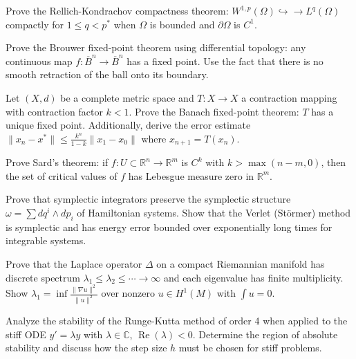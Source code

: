 \documentclass[12pt,a4paper]{exam}
\begin{document}
\begin{questions}
\question[4]
Prove the Rellich-Kondrachov compactness theorem: $W^{1,p}(\Omega) \hookrightarrow\!\!\!\to L^q(\Omega)$ compactly for $1 \leq q < p^*$ when $\Omega$ is bounded and $\partial\Omega$ is $C^1$.

\vspace{0.3cm}

\question[2]
Prove the Brouwer fixed-point theorem using differential topology: any continuous map $f: \overline{B}^n \to \overline{B}^n$ has a fixed point. Use the fact that there is no smooth retraction of the ball onto its boundary.

\vspace{0.3cm}

\question[2]
Let $(X, d)$ be a complete metric space and $T: X \to X$ a contraction mapping with contraction factor $k < 1$. Prove the Banach fixed-point theorem: $T$ has a unique fixed point. Additionally, derive the error estimate $\|x_n - x^*\| \leq \frac{k^n}{1-k} \|x_1 - x_0\|$ where $x_{n+1} = T(x_n)$.

\vspace{0.3cm}

\question[3]
Prove Sard's theorem: if $f: U \subset \mathbb{R}^n \to \mathbb{R}^m$ is $C^k$ with $k > \max(n-m, 0)$, then the set of critical values of $f$ has Lebesgue measure zero in $\mathbb{R}^m$.

\vspace{0.3cm}

\question[5]
Prove that symplectic integrators preserve the symplectic structure $\omega = \sum dq^i \wedge dp_i$ of Hamiltonian systems. Show that the Verlet (St\"ormer) method is symplectic and has energy error bounded over exponentially long times for integrable systems.

\vspace{0.3cm}

\question[5]
Prove that the Laplace operator $\Delta$ on a compact Riemannian manifold has discrete spectrum $\lambda_1 \leq \lambda_2 \leq \cdots \to \infty$ and each eigenvalue has finite multiplicity. Show $\lambda_1 = \inf \frac{\|\nabla u\|^2}{\|u\|^2}$ over nonzero $u \in H^1(M)$ with $\int u = 0$.

\vspace{0.3cm}

\question[5]
Analyze the stability of the Runge-Kutta method of order 4 when applied to the stiff ODE $y' = \lambda y$ with $\lambda \in \mathbb{C}$, $\operatorname{Re}(\lambda) < 0$. Determine the region of absolute stability and discuss how the step size $h$ must be chosen for stiff problems.


\end{questions}
\end{document}
